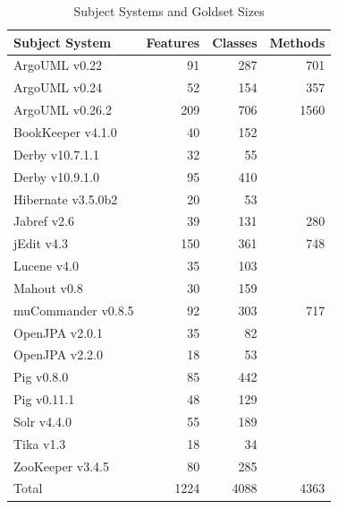 \begin{table}[t]
\renewcommand{\arraystretch}{1.3}
\footnotesize
\centering
\caption{Subject Systems and Goldset Sizes}
\begin{tabular}{lrrr}
    \toprule
    Subject System     & Features & Classes & Methods \\
    \midrule
    ArgoUML v0.22      & 91       & 287     & 701     \\
    ArgoUML v0.24      & 52       & 154     & 357     \\
    ArgoUML v0.26.2    & 209      & 706     & 1560    \\
    BookKeeper v4.1.0  & 40       & 152     &         \\
    Derby v10.7.1.1    & 32       & 55      &         \\
    Derby v10.9.1.0    & 95       & 410     &         \\
    Hibernate v3.5.0b2 & 20       & 53      &         \\
    Jabref v2.6        & 39       & 131     & 280     \\
    jEdit v4.3         & 150      & 361     & 748     \\
    Lucene v4.0        & 35       & 103     &         \\
    Mahout v0.8        & 30       & 159     &         \\
    muCommander v0.8.5 & 92       & 303     & 717     \\
    OpenJPA v2.0.1     & 35       & 82      &         \\
    OpenJPA v2.2.0     & 18       & 53      &         \\
    Pig v0.8.0         & 85       & 442     &         \\
    Pig v0.11.1        & 48       & 129     &         \\
    Solr v4.4.0        & 55       & 189     &         \\
    Tika v1.3          & 18       & 34      &         \\
    ZooKeeper v3.4.5   & 80       & 285     &         \\
    \midrule
    Total              & 1224     & 4088    & 4363    \\
    \bottomrule
\end{tabular}
\label{table:subjects}
\end{table}

